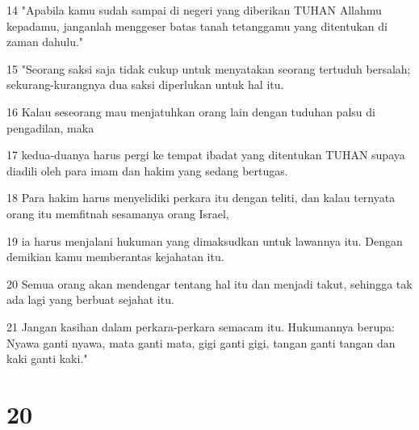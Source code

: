 \par 14 "Apabila kamu sudah sampai di negeri yang diberikan TUHAN Allahmu kepadamu, janganlah menggeser batas tanah tetanggamu yang ditentukan di zaman dahulu."
\par 15 "Seorang saksi saja tidak cukup untuk menyatakan seorang tertuduh bersalah; sekurang-kurangnya dua saksi diperlukan untuk hal itu.
\par 16 Kalau seseorang mau menjatuhkan orang lain dengan tuduhan palsu di pengadilan, maka
\par 17 kedua-duanya harus pergi ke tempat ibadat yang ditentukan TUHAN supaya diadili oleh para imam dan hakim yang sedang bertugas.
\par 18 Para hakim harus menyelidiki perkara itu dengan teliti, dan kalau ternyata orang itu memfitnah sesamanya orang Israel,
\par 19 ia harus menjalani hukuman yang dimaksudkan untuk lawannya itu. Dengan demikian kamu memberantas kejahatan itu.
\par 20 Semua orang akan mendengar tentang hal itu dan menjadi takut, sehingga tak ada lagi yang berbuat sejahat itu.
\par 21 Jangan kasihan dalam perkara-perkara semacam itu. Hukumannya berupa: Nyawa ganti nyawa, mata ganti mata, gigi ganti gigi, tangan ganti tangan dan kaki ganti kaki."

\chapter{20}

